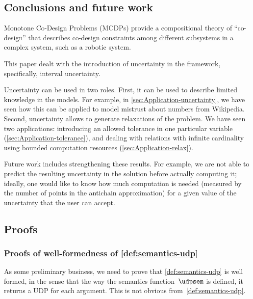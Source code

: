 \subsection{Conclusions and future work}

Monotone Co-Design Problems (MCDPs) provide a compositional theory
of ``co-design'' that describes co-design constraints among different
subsystems in a complex system, such as a robotic system.

This paper dealt with the introduction of uncertainty in the framework,
specifically, interval uncertainty.

Uncertainty can be used in two roles. First, it can be used to describe
limited knowledge in the models. For example, in \cref{sec:Application-uncertainty},
we have seen how this can be applied to model mistrust about numbers
from Wikipedia. Second, uncertainty allows to generate relaxations
of the problem. We have seen two applications: introducing an allowed
tolerance in one particular variable (\cref{sec:Application-tolerance}),
and dealing with relations with infinite cardinality using bounded
computation resources (\cref{sec:Application-relax}).

Future work includes strengthening these results. For example, we
are not able to predict the resulting uncertainty in the solution
before actually computing it; ideally, one would like to know how
much computation is needed (measured by the number of points in the
antichain approximation) for a given value of the uncertainty that
the user can accept.



\subsection{Proofs}

\subsubsection{Proofs of well-formedness of \cref{def:semantics-udp}}

As some preliminary business, we need to prove that \cref{def:semantics-udp}
is well formed, in the sense that the way the semantics function~$\udpsem$
is defined, it returns a UDP for each argument. This is not obvious
from~\cref{def:semantics-udp}.


